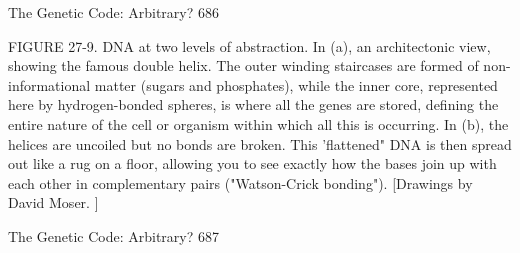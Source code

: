 The Genetic Code: Arbitrary?                                                           686

FIGURE 27-9. DNA at two levels of abstraction.
         In (a), an architectonic view, showing the famous double helix. The outer
winding staircases are formed of non-informational matter (sugars and phosphates),
while the inner core, represented here by hydrogen-bonded spheres, is where all the
genes are stored, defining the entire nature of the cell or organism within which all
this is occurring.
         In (b), the helices are uncoiled but no bonds are broken. This 'flattened" DNA
is then spread out like a rug on a floor, allowing you to see exactly how the bases join
up with each other in complementary pairs ("Watson-Crick bonding"). [Drawings by
David Moser. ]




The Genetic Code: Arbitrary?                                                        687

